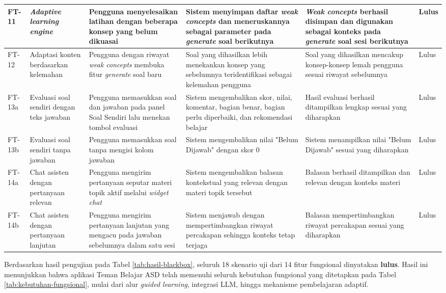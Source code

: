 \begin{longtable}{|L{0.8cm}|L{1.8cm}|L{2.2cm}|L{2.5cm}|L{2.5cm}|L{1.2cm}|}
FT-11 & \textit{Adaptive learning engine} &
Pengguna menyelesaikan latihan dengan beberapa konsep yang belum dikuasai &
Sistem menyimpan daftar \textit{weak concepts} dan meneruskannya sebagai parameter pada \textit{generate} soal berikutnya &
\textit{Weak concepts} berhasil disimpan dan digunakan sebagai konteks pada \textit{generate} soal sesi berikutnya &
Lulus \\
\hline

FT-12 & Adaptasi konten ber\-dasarkan kelemahan &
Pengguna dengan riwayat \textit{weak concepts} membuka fitur \textit{generate} soal baru &
Soal yang dihasilkan lebih menekankan konsep yang sebelumnya teridentifikasi sebagai kelemahan pengguna &
Soal yang dihasilkan mencakup konsep-konsep lemah pengguna sesuai riwayat sebelumnya &
Lulus \\
\hline

FT-13a & Evaluasi soal sendiri dengan teks jawaban &
Pengguna memasukkan soal dan jawaban pada panel Soal Sendiri lalu menekan tombol evaluasi &
Sistem mengembalikan skor, nilai, komentar, bagian benar, bagian perlu diperbaiki, dan rekomendasi belajar &
Hasil evaluasi berhasil ditampilkan lengkap sesuai yang diharapkan &
Lulus \\
\hline

FT-13b & Evaluasi soal sendiri tanpa jawaban &
Pengguna memasukkan soal tanpa mengisi kolom jawaban &
Sistem mengembalikan nilai "Belum Dijawab" dengan skor 0 &
Sistem menampilkan nilai "Belum Dijawab" sesuai yang diharapkan &
Lulus \\
\hline

FT-14a & Chat asisten dengan pertanyaan relevan &
Pengguna mengirim pertanyaan seputar materi topik aktif melalui \textit{widget chat} &
Sistem mengembalikan balasan kontekstual yang relevan dengan materi topik tersebut &
Balasan berhasil ditampilkan dan relevan dengan konteks materi &
Lulus \\
\hline

FT-14b & Chat asisten dengan pertanyaan lanjutan &
Pengguna mengirim pertanyaan lanjutan yang mengacu pada jawaban sebelumnya dalam satu sesi &
Sistem menjawab dengan mempertimbangkan riwayat percakapan sehingga konteks tetap terjaga &
Balasan mempertimbangkan riwayat percakapan sesuai yang diharapkan &
Lulus \\
\hline

\end{longtable}

Berdasarkan hasil pengujian pada Tabel \ref{tab:hasil-blackbox}, seluruh 18 skenario uji dari 14 fitur fungsional dinyatakan \textbf{lulus}. Hasil ini menunjukkan bahwa aplikasi Teman Belajar ASD telah memenuhi seluruh kebutuhan fungsional yang ditetapkan pada Tabel \ref{tab:kebutuhan-fungsional}, mulai dari alur \textit{guided learning}, integrasi LLM, hingga mekanisme pembelajaran adaptif.

